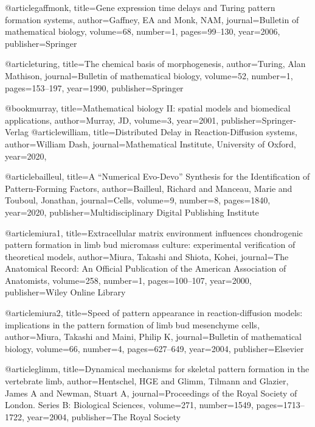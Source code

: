 @article{gaffmonk,
  title={Gene expression time delays and Turing pattern formation systems},
  author={Gaffney, EA and Monk, NAM},
  journal={Bulletin of mathematical biology},
  volume={68},
  number={1},
  pages={99--130},
  year={2006},
  publisher={Springer}
}

@article{turing,
  title={The chemical basis of morphogenesis},
  author={Turing, Alan Mathison},
  journal={Bulletin of mathematical biology},
  volume={52},
  number={1},
  pages={153--197},
  year={1990},
  publisher={Springer}
}


@book{murray,
  title={Mathematical biology II: spatial models and biomedical applications},
  author={Murray, JD},
  volume={3},
  year={2001},
  publisher={Springer-Verlag}
}
@article{william,
  title={Distributed Delay in Reaction-Diffusion systems},
  author={William Dash},
  journal={Mathematical Institute, University of Oxford},
  year={2020},
}


@article{bailleul,
  title={A “Numerical Evo-Devo” Synthesis for the Identification of Pattern-Forming Factors},
  author={Bailleul, Richard and Manceau, Marie and Touboul, Jonathan},
  journal={Cells},
  volume={9},
  number={8},
  pages={1840},
  year={2020},
  publisher={Multidisciplinary Digital Publishing Institute}
}

@article{miura1,
  title={Extracellular matrix environment influences chondrogenic pattern formation in limb bud micromass culture: experimental verification of theoretical models},
  author={Miura, Takashi and Shiota, Kohei},
  journal={The Anatomical Record: An Official Publication of the American Association of Anatomists},
  volume={258},
  number={1},
  pages={100--107},
  year={2000},
  publisher={Wiley Online Library}
}

@article{miura2,
  title={Speed of pattern appearance in reaction-diffusion models: implications in the pattern formation of limb bud mesenchyme cells},
  author={Miura, Takashi and Maini, Philip K},
  journal={Bulletin of mathematical biology},
  volume={66},
  number={4},
  pages={627--649},
  year={2004},
  publisher={Elsevier}
}

@article{glimm,
  title={Dynamical mechanisms for skeletal pattern formation in the vertebrate limb},
  author={Hentschel, HGE and Glimm, Tilmann and Glazier, James A and Newman, Stuart A},
  journal={Proceedings of the Royal Society of London. Series B: Biological Sciences},
  volume={271},
  number={1549},
  pages={1713--1722},
  year={2004},
  publisher={The Royal Society}
}

